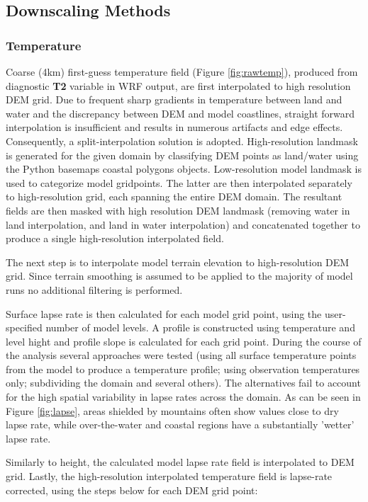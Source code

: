 \documentclass{article}
\begin{document}
\subsection{Downscaling Methods}
\subsubsection{Temperature}
Coarse (4km) first-guess temperature field (Figure \ref{fig:rawtemp}), produced from diagnostic \textbf{T2} variable in WRF output, are first interpolated to high resolution DEM grid. Due to frequent sharp gradients in temperature between land and water and the discrepancy between DEM and model coastlines, straight forward interpolation is insufficient and results in numerous artifacts and edge effects. Consequently, a split-interpolation solution is adopted. High-resolution landmask is generated for the given domain by classifying DEM points as land/water using the Python basemaps coastal polygons objects. Low-resolution model landmask is used to categorize model gridpoints. The latter are then interpolated separately to high-resolution grid, each spanning the entire DEM domain. The resultant fields are then masked with high resolution DEM landmask (removing water in land interpolation, and land in water interpolation) and concatenated together to produce a single high-resolution interpolated field. 

The next step is to interpolate model terrain elevation to high-resolution DEM grid. Since terrain smoothing is assumed to be applied to the majority of model runs no additional filtering is performed. 

Surface lapse rate is then calculated for each model grid point, using the user-specified number of model levels. A profile is constructed using temperature and level hight and profile slope is calculated for each grid point. During the course of the analysis several approaches were tested (using all surface temperature points from the model to produce a temperature profile; using observation temperatures only; subdividing the domain and several others). The alternatives fail to account for the high spatial variability in lapse rates across the domain. As can be seen in Figure \ref{fig:lapse}, areas shielded by mountains often show values close to dry lapse rate, while over-the-water and coastal regions have a substantially 'wetter' lapse rate. 

Similarly to height, the calculated model lapse rate field is interpolated to DEM grid. Lastly, the high-resolution interpolated temperature field is lapse-rate corrected, using the steps below for each DEM grid point:
\end{document}
